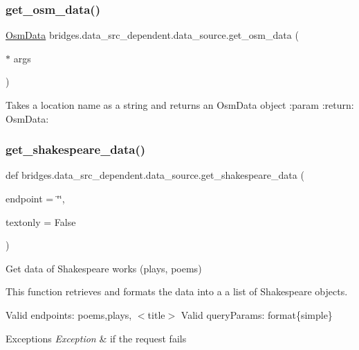 \subsubsection{\texorpdfstring{get\_osm\_data()}{get\_osm\_data()}}
{\footnotesize\ttfamily  \mbox{\hyperlink{classbridges_1_1data__src__dependent_1_1osm_1_1_osm_data}{Osm\+Data}} bridges.\+data\+\_\+src\+\_\+dependent.\+data\+\_\+source.\+get\+\_\+osm\+\_\+data (\begin{DoxyParamCaption}\item[{$\ast$}]{args }\end{DoxyParamCaption})}



Takes a location name as a string and returns an Osm\+Data object \+:param \+:return\+: Osm\+Data\+: 

\mbox{\label{namespacebridges_1_1data__src__dependent_1_1data__source_a141593343ceef42e35072b3151a8b2db}} 
\subsubsection{\texorpdfstring{get\_shakespeare\_data()}{get\_shakespeare\_data()}}
{\footnotesize\ttfamily def bridges.\+data\+\_\+src\+\_\+dependent.\+data\+\_\+source.\+get\+\_\+shakespeare\+\_\+data (\begin{DoxyParamCaption}\item[{}]{endpoint = {\ttfamily \char`\"{}\char`\"{}},  }\item[{}]{textonly = {\ttfamily False} }\end{DoxyParamCaption})}



Get data of Shakespeare works (plays, poems) 

This function retrieves and formats the data into a a list of Shakespeare objects.

Valid endpoints\+: \textquotesingle{}poems\textquotesingle{},\textquotesingle{}plays\textquotesingle{}, $<$title$>$ Valid query\+Params\+: format\{simple\}


\begin{DoxyExceptions}{Exceptions}
{\em Exception} & if the request fails\\
\hline
\end{DoxyExceptions}

